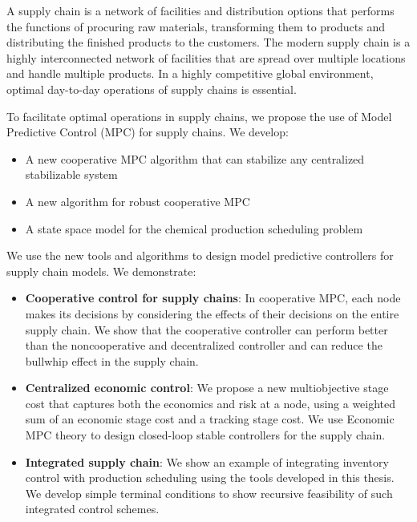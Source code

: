 A supply chain is a network of facilities and distribution options
that performs the functions of procuring raw materials, transforming
them to products and distributing the finished products to the
customers. The modern supply chain is a highly interconnected network
of facilities that are spread over multiple locations and handle
multiple products. In a highly competitive global
environment, optimal day-to-day operations of supply chains is
essential.

To facilitate optimal operations in supply chains, we propose the use of
Model Predictive Control (MPC) for supply chains. We develop:  

\begin{itemize}
\item A new cooperative MPC algorithm that can stabilize any
  centralized stabilizable system
\item A new algorithm for robust cooperative MPC
\item A state space model for the chemical production scheduling problem
\end{itemize}

We use the new tools and algorithms to design model predictive
controllers for supply chain models. We demonstrate:

\begin{itemize}
\item {\textbf{Cooperative control for supply chains}}: In cooperative MPC, each node makes its
  decisions by considering the effects of their decisions on the
  entire supply chain. We show that the cooperative controller can
  perform better than the noncooperative and decentralized  controller
  and can reduce the  bullwhip effect in the supply chain. 

\item {\textbf{Centralized economic control}}: We propose a new multiobjective
  stage cost that captures both the economics and risk at a node,
  using a weighted sum of an economic stage cost and a tracking stage
  cost. We use Economic MPC theory \citep{amrit:rawlings:angeli:2011} to design
  closed-loop stable controllers for the supply chain. 

\item {\textbf{Integrated supply chain}}: We show an example of integrating
  inventory control with production scheduling using the tools
  developed in this thesis. We develop simple terminal conditions to
  show recursive feasibility of such integrated control schemes.
\end{itemize}

